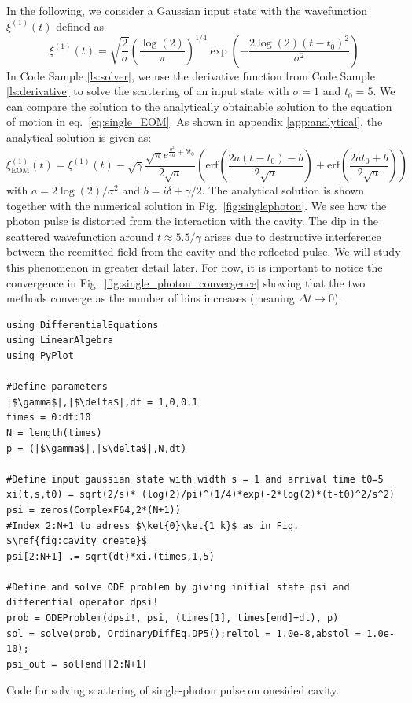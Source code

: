 In the following, we consider a Gaussian input state with the wavefunction $\xi^{(1)}(t)$ defined as 
\begin{equation}
    \xi^{(1)}(t) = \sqrt{\frac{2}{\sigma}} \left(\frac{\log(2)}{\pi}\right)^{1/4} \exp\left(-\frac{2\log(2)(t-t_0)^2}{\sigma^2}\right) \label{eq:gaussian}
\end{equation}
In Code Sample \ref{ls:solver}, we use the derivative function from Code Sample \ref{ls:derivative} to solve the scattering of an input state with $\sigma = 1$ and $t_0 = 5$. We can compare the solution to the analytically obtainable solution to the equation of motion in eq.~\eqref{eq:single_EOM}. As shown in appendix \ref{app:analytical}, the analytical solution is given as:
\begin{equation}
    \xi^{(1)}_\mathrm{EOM}(t) =  \xi^{(1)}(t) - \sqrt{\gamma}\frac{\sqrt{\pi} e^{\frac{b^2}{4a}+bt_0}}{2\sqrt{a}}\left(\text{erf}\left(\frac{2a(t-t_0)-b}{2\sqrt{a}}\right) + \text{erf}\left(\frac{2at_0+b}{2\sqrt{a}}\right)\right) \label{eq:onephoton_analytical}
\end{equation}
with $a = 2 \log(2)/\sigma^2$ and $b = i \delta + \gamma/2$. The analytical solution is shown together with the numerical solution in Fig.~\ref{fig:singlephoton}. We see how the photon pulse is distorted from the interaction with the cavity. The dip in the scattered wavefunction around $t \approx 5.5/\gamma$ arises due to destructive interference between the reemitted field from the cavity and the reflected pulse. We will study this phenomenon in greater detail later. For now, it is important to notice the convergence in Fig.~\ref{fig:single_photon_convergence} showing that the two methods converge as the number of bins increases (meaning $\Delta t \rightarrow 0$). 

\begin{listing}[!ht]
\begin{verbatim}
using DifferentialEquations
using LinearAlgebra
using PyPlot

#Define parameters
|$\gamma$|,|$\delta$|,dt = 1,0,0.1
times = 0:dt:10
N = length(times)
p = (|$\gamma$|,|$\delta$|,N,dt)

#Define input gaussian state with width s = 1 and arrival time t0=5
xi(t,s,t0) = sqrt(2/s)* (log(2)/pi)^(1/4)*exp(-2*log(2)*(t-t0)^2/s^2)
psi = zeros(ComplexF64,2*(N+1))
#Index 2:N+1 to adress $\ket{0}\ket{1_k}$ as in Fig. $\ref{fig:cavity_create}$
psi[2:N+1] .= sqrt(dt)*xi.(times,1,5)

#Define and solve ODE problem by giving initial state psi and differential operator dpsi!
prob = ODEProblem(dpsi!, psi, (times[1], times[end]+dt), p)
sol = solve(prob, OrdinaryDiffEq.DP5();reltol = 1.0e-8,abstol = 1.0e-10);
psi_out = sol[end][2:N+1]
\end{verbatim}
\caption{Code for solving scattering of single-photon pulse on onesided cavity. }
\label{ls:solver}
\end{listing}


